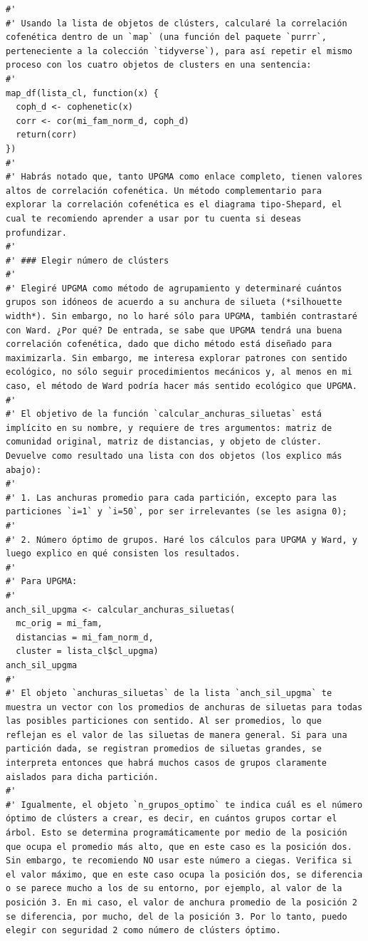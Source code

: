 \documentclass[11pt,]{article}
\begin{document}
\begin{verbatim}
#' 
#' Usando la lista de objetos de clústers, calcularé la correlación cofenética dentro de un `map` (una función del paquete `purrr`, perteneciente a la colección `tidyverse`), para así repetir el mismo proceso con los cuatro objetos de clusters en una sentencia:
#'
map_df(lista_cl, function(x) {
  coph_d <- cophenetic(x)
  corr <- cor(mi_fam_norm_d, coph_d)
  return(corr)
})
#' 
#' Habrás notado que, tanto UPGMA como enlace completo, tienen valores altos de correlación cofenética. Un método complementario para explorar la correlación cofenética es el diagrama tipo-Shepard, el cual te recomiendo aprender a usar por tu cuenta si deseas profundizar.
#' 
#' ### Elegir número de clústers
#' 
#' Elegiré UPGMA como método de agrupamiento y determinaré cuántos grupos son idóneos de acuerdo a su anchura de silueta (*silhouette width*). Sin embargo, no lo haré sólo para UPGMA, también contrastaré con Ward. ¿Por qué? De entrada, se sabe que UPGMA tendrá una buena correlación cofenética, dado que dicho método está diseñado para maximizarla. Sin embargo, me interesa explorar patrones con sentido ecológico, no sólo seguir procedimientos mecánicos y, al menos en mi caso, el método de Ward podría hacer más sentido ecológico que UPGMA.
#' 
#' El objetivo de la función `calcular_anchuras_siluetas` está implícito en su nombre, y requiere de tres argumentos: matriz de comunidad original, matriz de distancias, y objeto de clúster. Devuelve como resultado una lista con dos objetos (los explico más abajo):
#' 
#' 1. Las anchuras promedio para cada partición, excepto para las particiones `i=1` y `i=50`, por ser irrelevantes (se les asigna 0);
#' 
#' 2. Número óptimo de grupos. Haré los cálculos para UPGMA y Ward, y luego explico en qué consisten los resultados.
#' 
#' Para UPGMA:
#' 
anch_sil_upgma <- calcular_anchuras_siluetas(
  mc_orig = mi_fam, 
  distancias = mi_fam_norm_d, 
  cluster = lista_cl$cl_upgma)
anch_sil_upgma
#' 
#' El objeto `anchuras_siluetas` de la lista `anch_sil_upgma` te muestra un vector con los promedios de anchuras de siluetas para todas las posibles particiones con sentido. Al ser promedios, lo que reflejan es el valor de las siluetas de manera general. Si para una partición dada, se registran promedios de siluetas grandes, se interpreta entonces que habrá muchos casos de grupos claramente aislados para dicha partición.
#' 
#' Igualmente, el objeto `n_grupos_optimo` te indica cuál es el número óptimo de clústers a crear, es decir, en cuántos grupos cortar el árbol. Esto se determina programáticamente por medio de la posición que ocupa el promedio más alto, que en este caso es la posición dos. Sin embargo, te recomiendo NO usar este número a ciegas. Verifica si el valor máximo, que en este caso ocupa la posición dos, se diferencia o se parece mucho a los de su entorno, por ejemplo, al valor de la posición 3. En mi caso, el valor de anchura promedio de la posición 2 se diferencia, por mucho, del de la posición 3. Por lo tanto, puedo elegir con seguridad 2 como número de clústers óptimo.

\end{verbatim}
\end{document}
